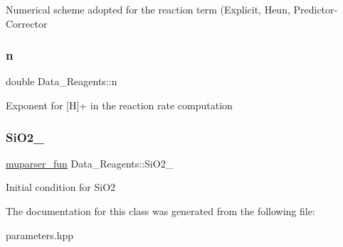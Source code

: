 Numerical scheme adopted for the reaction term (Explicit, Heun, Predictor-\/\+Corrector \mbox{\label{classData__6Reagents_ab4e2397757b2d8d4c6c7871fe73d5f8d}} 
\subsubsection{\texorpdfstring{n}{n}}
{\footnotesize\ttfamily double Data\+\_\+Reagents\+::n}

Exponent for \mbox{[}H\mbox{]}+ in the reaction rate computation \mbox{\label{classData__6Reagents_a4bd4a6b52f5fec8657d3e41a45509830}} 
\subsubsection{\texorpdfstring{Si\+O2\+\_}{SiO2\_0}}
{\footnotesize\ttfamily \hyperlink{classmuparser__fun}{muparser\+\_\+fun} Data\+\_\+Reagents\+::\+Si\+O2\+\_}

Initial condition for Si\+O2 

The documentation for this class was generated from the following file\+:\begin{DoxyCompactItemize}
\item 
parameters.\+hpp\end{DoxyCompactItemize}
